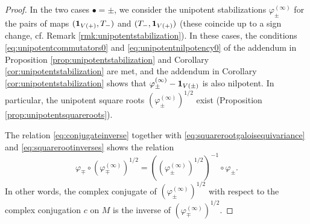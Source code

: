 \documentclass[a4paper,12pt,reqno]{amsart}
\theoremstyle{plain}
\theoremstyle{remark}
\begin{document}
\begin{proof}
    In the two cases $\bullet=\pm$, we consider the unipotent stabilizations $\varphi_{\pm}^{(\infty)}$ for the pairs of maps $({\bf1}_{V(+)},T_-)$ and $(T_-,{\bf1}_{V(+)})$ (these coincide up to a sign change, cf. Remark \ref{rmk:unipotentstabilization}). In these cases, the conditions \eqref{eq:unipotentcommutators0} and \eqref{eq:unipotentnilpotency0} of the addendum in Proposition \ref{prop:unipotentstabilization} and Corollary \ref{cor:unipotentstabilization} are met, and the addendum in Corollary \ref{cor:unipotentstabilization} shows that $\varphi_{\pm}^{(\infty)}-{\bf1}_{V(\pm)}$ is also nilpotent. In particular, the unipotent square roots $(\varphi_{\pm}^{(\infty)})^{1/2}$ exist (Proposition \ref{prop:unipotentsquareroots}).

    The relation \eqref{eq:conjugateinverse} together with \eqref{eq:squarerootgaloisequivariance} and \eqref{eq:squarerootinverses} shows the relation
    \begin{equation}
    \varphi_\mp\circ (\varphi_{\mp}^{(\infty)})^{1/2}=
    \left((\varphi_{\pm}^{(\infty)})^{1/2}\right)^{-1}\circ\varphi_\pm.
    \label{eq:pmsquarerootsinverses}
    \end{equation}
    In other words, the complex conjugate of $(\varphi_{\pm}^{(\infty)})^{1/2}$ with respect to the complex conjugation $c$ on $M$ is the inverse of $(\varphi_{\mp}^{(\infty)})^{1/2}$.
    

\end{proof}
\end{document}
